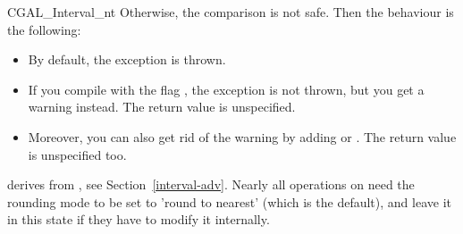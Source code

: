 \begin{ccClass} {CGAL_Interval_nt}
Otherwise, the comparison is not safe.  Then the behaviour is the following:
\begin{itemize}
\item By default, the exception
     is thrown.
\item If you compile with the flag , the exception
    is not thrown, but you get a warning instead.
    The return value is unspecified.
\item Moreover, you can also get rid of the warning by adding
     or .
    The return value is unspecified too.
\end{itemize}

\ccImplementation

 derives from , 
see Section~\ref{interval-adv}.  Nearly all operations on
 need the rounding mode to be set to 'round to nearest'
(which is the default),
and leave it in this state if they have to modify it internally.

% 
% 
% 
% 
% 
% 

\end{ccClass}

